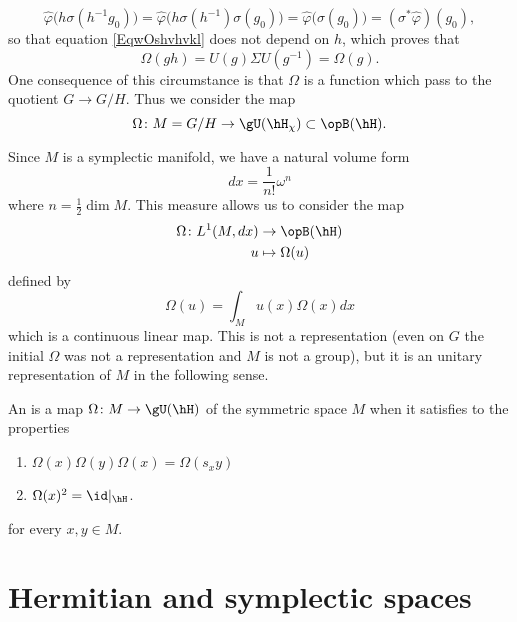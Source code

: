 \begin{equation}
	\hat\varphi\big( h\sigma(h^{-1}g_0) \big)=\hat\varphi\big( h\sigma(h^{-1})\sigma(g_0) \big)=\hat\varphi\big( \sigma(g_0) \big)=(\sigma^*\hat\varphi)(g_0),
\end{equation}
so that equation \eqref{EqwOshvhvkl} does not depend on $h$, which proves that
\begin{equation}
	\Omega(gh)=U(g)\Sigma U(g^{-1})=\Omega(g).
\end{equation}
One consequence of this circumstance is that $\Omega$ is a function which pass to the quotient $G\to G/H$. Thus we consider the map
\begin{equation}
	\Omega\colon M=G/H\to \gU(\hH_{\chi})\subset\opB(\hH).
\end{equation}

Since $M$ is a symplectic manifold, we have a natural volume form
\begin{equation}
	dx=\frac{1}{ n! }\omega^n
\end{equation}
where $n=\frac{ 1 }{2}\dim M$. This measure allows us to consider the map
\begin{equation}
	\begin{aligned}
		\Omega\colon L^1(M,dx)&\to \opB(\hH) \\
		u&\mapsto \Omega(u)
	\end{aligned}
\end{equation}
defined by
\begin{equation}
	\Omega(u)=\int_M u(x)\Omega(x)dx
\end{equation}
which is a continuous linear map. This is not a representation (even on $G$ the initial $\Omega$ was not a representation and $M$ is not a group), but it is an unitary representation of $M$ in the following sense.

\begin{definition}
	An  is a map $\Omega\colon M\to \gU(\hH)$ of the symmetric space $M$ when it satisfies to the properties
	\begin{enumerate}
		\item
			$\Omega(x)\Omega(y)\Omega(x)=\Omega(s_xy)$
		\item
			$\Omega(x)^2=\id|_{\hH}$.

	\end{enumerate}
	for every $x,y\in M$.
\end{definition}
\section{Hermitian and symplectic spaces}
\label{SecHermEtSymplecticSpaces}

